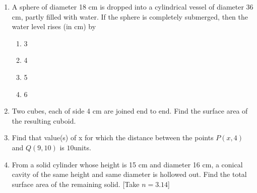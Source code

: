 \begin{enumerate}
    \item A sphere of diameter 18 cm is dropped into a cylindrical vessel of diameter 36 cm, partly filled with water. If the sphere is completely submerged, then the water level rises (in cm) by
    \begin{enumerate}
        \item 3
        \item 4 
        \item 5
        \item 6
    \end{enumerate}
    \item Two cubes, each of side 4 cm are joined end to end. Find the surface area of the resulting cuboid.
    \item Find that value(s) of x for which the distance between the points $P(x,4)$ and $Q(9,10)$ is $10$units.
    \item From a solid cylinder whose height is 15 cm and diameter 16 cm, a conical cavity of the same height and same diameter is hollowed out. Find the total surface area of the remaining solid. [Take $n=3.14$]
\end{enumerate}
